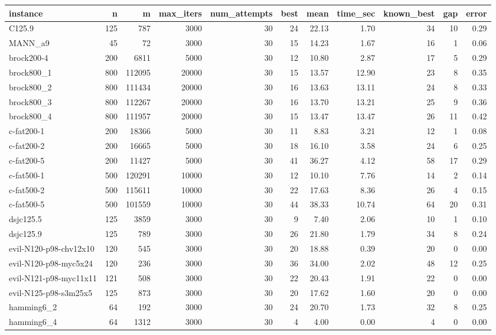 \begin{tabular}{lrrrrrrrrrr}
\toprule
instance & n & m & max\_iters & num\_attempts & best & mean & time\_sec & known\_best & gap & error \\
\midrule
C125.9 & 125 & 787 & 3000 & 30 & 24 & 22.13 & 1.70 & 34 & 10 & 0.29 \\
MANN\_a9 & 45 & 72 & 3000 & 30 & 15 & 14.23 & 1.67 & 16 & 1 & 0.06 \\
brock200-4 & 200 & 6811 & 5000 & 30 & 12 & 10.80 & 2.87 & 17 & 5 & 0.29 \\
brock800\_1 & 800 & 112095 & 20000 & 30 & 15 & 13.57 & 12.90 & 23 & 8 & 0.35 \\
brock800\_2 & 800 & 111434 & 20000 & 30 & 16 & 13.63 & 13.11 & 24 & 8 & 0.33 \\
brock800\_3 & 800 & 112267 & 20000 & 30 & 16 & 13.70 & 13.21 & 25 & 9 & 0.36 \\
brock800\_4 & 800 & 111957 & 20000 & 30 & 15 & 13.47 & 13.47 & 26 & 11 & 0.42 \\
c-fat200-1 & 200 & 18366 & 5000 & 30 & 11 & 8.83 & 3.21 & 12 & 1 & 0.08 \\
c-fat200-2 & 200 & 16665 & 5000 & 30 & 18 & 16.10 & 3.58 & 24 & 6 & 0.25 \\
c-fat200-5 & 200 & 11427 & 5000 & 30 & 41 & 36.27 & 4.12 & 58 & 17 & 0.29 \\
c-fat500-1 & 500 & 120291 & 10000 & 30 & 12 & 10.10 & 7.76 & 14 & 2 & 0.14 \\
c-fat500-2 & 500 & 115611 & 10000 & 30 & 22 & 17.63 & 8.36 & 26 & 4 & 0.15 \\
c-fat500-5 & 500 & 101559 & 10000 & 30 & 44 & 38.33 & 10.74 & 64 & 20 & 0.31 \\
dsjc125.5 & 125 & 3859 & 3000 & 30 & 9 & 7.40 & 2.06 & 10 & 1 & 0.10 \\
dsjc125.9 & 125 & 789 & 3000 & 30 & 26 & 21.80 & 1.79 & 34 & 8 & 0.24 \\
evil-N120-p98-chv12x10 & 120 & 545 & 3000 & 30 & 20 & 18.88 & 0.39 & 20 & 0 & 0.00 \\
evil-N120-p98-myc5x24 & 120 & 236 & 3000 & 30 & 36 & 34.00 & 2.02 & 48 & 12 & 0.25 \\
evil-N121-p98-myc11x11 & 121 & 508 & 3000 & 30 & 22 & 20.43 & 1.91 & 22 & 0 & 0.00 \\
evil-N125-p98-s3m25x5 & 125 & 873 & 3000 & 30 & 20 & 17.62 & 1.60 & 20 & 0 & 0.00 \\
hamming6\_2 & 64 & 192 & 3000 & 30 & 24 & 20.70 & 1.73 & 32 & 8 & 0.25 \\
hamming6\_4 & 64 & 1312 & 3000 & 30 & 4 & 4.00 & 0.00 & 4 & 0 & 0.00 \\

\end{tabular}
